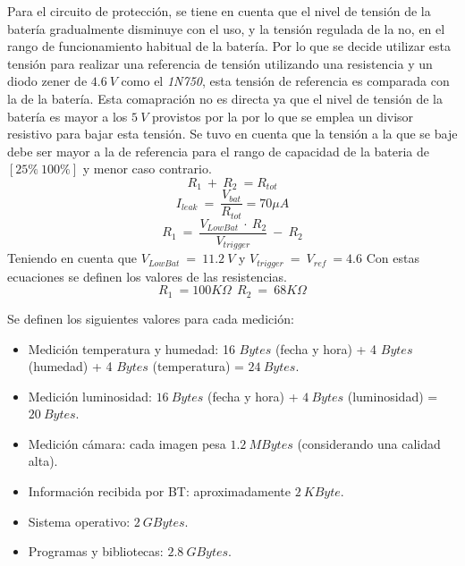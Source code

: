 Para el circuito de protección, se tiene en cuenta que el nivel de tensión de la batería gradualmente disminuye con el uso, y la tensión regulada de la \rspi no, en el rango de funcionamiento habitual de la batería. Por lo que se decide utilizar esta tensión para realizar una referencia de tensión utilizando una resistencia y un diodo zener de $4.6 \ V$ como el \textit{1N750}, esta tensión de referencia es comparada con la de la  batería. Esta comapración no es directa ya que el nivel de tensión de la batería es mayor a los $5 \ V$ provistos por la \rspi por lo que se emplea un divisor resistivo para bajar esta tensión. Se tuvo en cuenta que la tensión a la que se baje debe ser mayor a la de referencia para el rango de capacidad de la bateria de $[25\% ~ 100\%]$ y menor caso contrario. 
\begin{equation}
R_1 \ +\ R_2 \ = R_{tot}
\end{equation}
\begin{equation}
I_{leak} \ = \ \frac{V_{bat}}{R_{tot}}  = 70 \mu A
\end{equation}
\begin{equation}
R_1 \ = \ \frac{V_{LowBat} \ \cdot \ R_2}{V_{trigger}} \ - \ R_2
\end{equation}
Teniendo en cuenta que $V_{LowBat} \ = \ 11.2 \ V$ y $V_{trigger} \ = \ V_{ref} \ = 4.6$
Con estas ecuaciones se definen los valores de las resistencias.
\begin{equation}
R_1 \ =100K\Omega  \ \ R_2 \  = \ 68K\Omega 
\end{equation}

Se definen los siguientes valores para cada medición:
\begin{itemize}
	\item Medición temperatura y humedad: 16 $Bytes$ (fecha y hora) + 4 $Bytes$ (humedad) + 4 $Bytes$ (temperatura) = $24 \ Bytes$.
	\item Medición luminosidad: $16 \ Bytes$ (fecha y hora) + $4 \ Bytes$ (luminosidad) = $20 \ Bytes$.
	\item Medición cámara: cada imagen pesa $1.2 \ MBytes$ \cite{ref:rpicam} (considerando una calidad alta).
	\item Información recibida por BT: aproximadamente $2 \ KByte$.
	\item Sistema operativo: $2 \ GBytes$.
	\item Programas y bibliotecas: $2.8 \ GBytes$.
\end{itemize}

